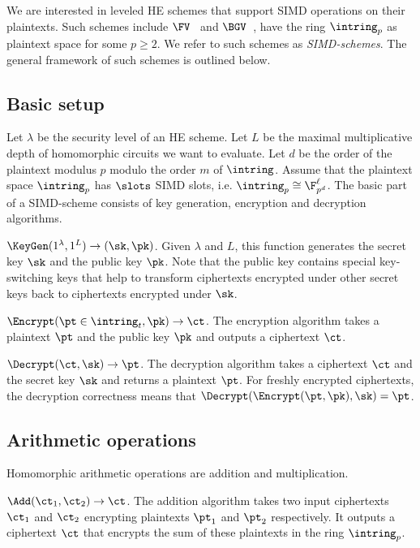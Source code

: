 We are interested in leveled HE schemes that support SIMD operations on their plaintexts.
Such schemes include $\FV$~\cite{FV12} and $\BGV$~\cite{BGV12}, have the ring $\intring_p$ as plaintext space for some $p \geq 2$.
We refer to such schemes as \emph{SIMD-schemes}.
The general framework of such schemes is outlined below.

\subsection{Basic setup}

Let $\lambda$ be the security level of an HE scheme.
Let $L$ be the maximal multiplicative depth of homomorphic circuits we want to evaluate.
Let $d$ be the order of the plaintext modulus $p$ modulo the order $m$ of $\intring$.
Assume that the plaintext space $\intring_p$ has $\slots$ SIMD slots, i.e. $\intring_p \cong \F^\ell_{p^d}$.
The basic part of a SIMD-scheme consists of key generation, encryption and decryption algorithms.

$\KeyGen(1^\lambda, 1^L) \rightarrow (\sk, \pk)$. Given $\lambda$ and $L$, this function generates the secret key $\sk$ and the public key $\pk$.
Note that the public key contains special key-switching keys that help to transform ciphertexts encrypted under other secret keys back to ciphertexts encrypted under $\sk$. 

$\Encrypt(\pt \in \intring_t, \pk) \rightarrow \ct$. The encryption algorithm takes a plaintext $\pt$ and the public key $\pk$ and outputs a ciphertext $\ct$.

$\Decrypt(\ct, \sk) \rightarrow \pt$. The decryption algorithm takes a ciphertext $\ct$ and the secret key $\sk$ and returns a plaintext $\pt$.
For freshly encrypted ciphertexts, the decryption correctness means that $\Decrypt(\Encrypt(\pt, \pk), \sk) = \pt$. 

\subsection{Arithmetic operations}

Homomorphic arithmetic operations are addition and multiplication.

$\Add(\ct_1, \ct_2) \rightarrow \ct$. The addition algorithm takes two input ciphertexts $\ct_1$ and $\ct_2$ encrypting plaintexts $\pt_1$ and $\pt_2$ respectively.
It outputs a ciphertext $\ct$ that encrypts the sum of these plaintexts in the ring $\intring_p$.

